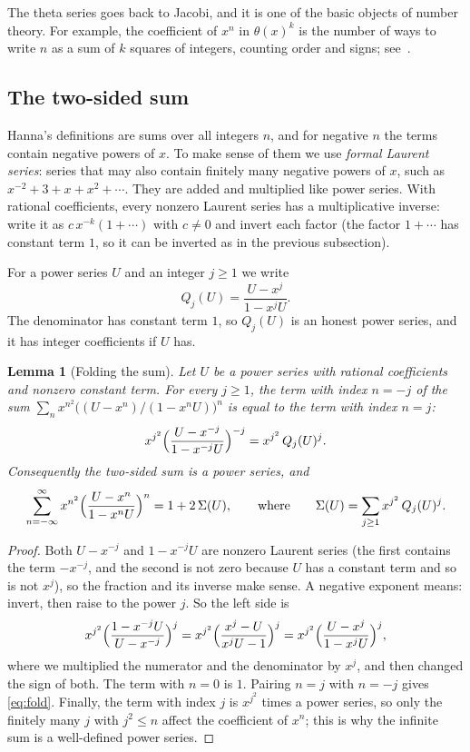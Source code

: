 \documentclass[11pt,a4paper]{article}
\newtheorem{lemma}[theorem]{Lemma}
\theoremstyle{definition}
\theoremstyle{remark}
\begin{document}
The theta series goes back to Jacobi, and it is one of the basic objects of number theory. For example, the
coefficient of $x^n$ in $\theta(x)^k$ is the number of ways to write $n$ as a sum of $k$ squares of integers,
counting order and signs; see~\cite{grosswald}.

\subsection{The two-sided sum}\label{sec:fold}
Hanna's definitions are sums over all integers $n$, and for negative $n$ the terms contain negative powers of $x$. To
make sense of them we use \emph{formal Laurent series}: series that may also contain finitely many negative powers of
$x$, such as $x^{-2}+3+x+x^2+\cdots$. They are added and multiplied like power series. With rational coefficients,
every nonzero Laurent series has a multiplicative inverse: write it as $c\,x^{-k}(1+\cdots)$ with $c\ne0$ and invert
each factor (the factor $1+\cdots$ has constant term $1$, so it can be inverted as in the previous subsection).

For a power series $U$ and an integer $j\ge1$ we write
\[
Q_j(U)=\frac{U-x^j}{1-x^jU}.
\]
The denominator has constant term $1$, so $Q_j(U)$ is an honest power series, and it has integer coefficients if $U$
has.

\begin{lemma}[Folding the sum]\label{lem:fold}
Let $U$ be a power series with rational coefficients and nonzero constant term. For every $j\ge1$, the term with index
$n=-j$ of the sum $\sum_{n}x^{n^2}\bigl((U-x^n)/(1-x^nU)\bigr)^n$ is equal to the term with index $n=j$:
\[
x^{j^2}\Bigl(\frac{U-x^{-j}}{1-x^{-j}U}\Bigr)^{-j}=x^{j^2}\,Q_j(U)^j .
\]
Consequently the two-sided sum is a power series, and
\begin{equation}\label{eq:fold}
\sum_{n=-\infty}^{\infty}x^{n^2}\Bigl(\frac{U-x^n}{1-x^nU}\Bigr)^n=1+2\,\Sigma(U),
\qquad\text{where}\qquad
\Sigma(U)=\sum_{j\ge1}x^{j^2}\,Q_j(U)^j .
\end{equation}
\end{lemma}

\begin{proof}
Both $U-x^{-j}$ and $1-x^{-j}U$ are nonzero Laurent series (the first contains the term $-x^{-j}$, and the second is
not zero because $U$ has a constant term and so is not $x^j$), so the fraction and its inverse make sense. A negative
exponent means: invert, then raise to the power $j$. So the left side is
\[
x^{j^2}\Bigl(\frac{1-x^{-j}U}{U-x^{-j}}\Bigr)^{j}
=x^{j^2}\Bigl(\frac{x^j-U}{x^jU-1}\Bigr)^{j}
=x^{j^2}\Bigl(\frac{U-x^j}{1-x^jU}\Bigr)^{j},
\]
where we multiplied the numerator and the denominator by $x^j$, and then changed the sign of both. The term with
$n=0$ is $1$. Pairing $n=j$ with $n=-j$ gives \eqref{eq:fold}. Finally, the term with index $j$ is $x^{j^2}$ times a
power series, so only the finitely many $j$ with $j^2\le n$ affect the coefficient of $x^n$; this is why the infinite
sum is a well-defined power series.
\end{proof}
\end{document}
